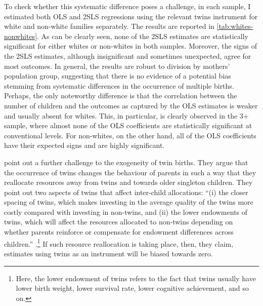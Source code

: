 To check whether this systematic difference poses a challenge, in each sample, I estimated both OLS and 2SLS regressions using the relevant twins instrument for white and non-white families separately. The results are reported in \autoref{tab:whites-nonwhites}. As can be clearly seen, none of the 2SLS estimates are statistically significant for either whites or non-whites in both samples. Moreover, the signs of the 2SLS estimates, although insignificant and sometimes unexpected, agree for most outcomes. In general, the results are robust to division by mothers' population group, suggesting that there is no evidence of a potential bias stemming from systematic differences in the occurrence of multiple births. Perhaps, the only noteworthy difference is that the correlation between the number of children and the outcomes as captured by the OLS estimates is weaker and usually absent for whites. This, in particular, is clearly observed in the 3+ sample, where almost none of the OLS coefficients are statistically significant at conventional levels. For non-whites, on the other hand, all of the OLS coefficients have their expected signs and are highly significant. 

\textcite{rosenzweig_population_2009} point out a further challenge to the exogeneity of twin births. They argue that the occurrence of twins changes the behaviour of parents in such a way that they reallocate resources away from twins and towards older singleton children. They point out two aspects of twins that affect inter-child allocations: \enquote{(i) the closer spacing of twins, which makes investing in the average quality of the twins more costly compared with investing in non-twins, and (ii) the lower endowments of twins, which will affect the resources allocated to non-twins depending on whether parents reinforce or compensate for endowment differences across children.} \parencite[1152]{rosenzweig_population_2009}.\footnote{ Here, the lower endowment of twins refers to the fact that twins usually have lower birth weight, lower survival rate, lower cognitive achievement, and so on. } If such resource reallocation is taking place, then, they claim, estimates using twins as an instrument will be biased towards zero.

